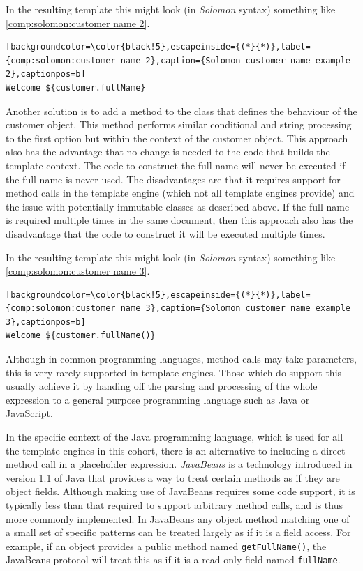 In the resulting template this might look (in \emph{Solomon} syntax) something like \autoref{comp:solomon:customer name 2}.

\begin{lstlisting}[backgroundcolor=\color{black!5},escapeinside={(*}{*)},label={comp:solomon:customer name 2},caption={Solomon customer name example 2},captionpos=b]
Welcome ${customer.fullName}
\end{lstlisting}

Another solution is to add a method to the class that defines the behaviour of the customer object. This method performs similar conditional and string processing to the first option but within the context of the customer object. This approach also has the advantage that no change is needed to the code that builds the template context. The code to construct the full name will never be executed if the full name is never used. The disadvantages are that it requires support for method calls in the \gls{template engine} (which not all \gls{template engine}s provide) and the issue with potentially immutable classes as described above. If the full name is required multiple times in the same document, then this approach also has the disadvantage that the code to construct it will be executed multiple times.

In the resulting template this might look (in \emph{Solomon} syntax) something like \autoref{comp:solomon:customer name 3}.

\begin{lstlisting}[backgroundcolor=\color{black!5},escapeinside={(*}{*)},label={comp:solomon:customer name 3},caption={Solomon customer name example 3},captionpos=b]
Welcome ${customer.fullName()}
\end{lstlisting}

Although in common \gls{programming language}s, method calls may take parameters, this is very rarely supported in \gls{template engine}s. Those which do support this usually achieve it by handing off the parsing and processing of the whole expression to a general purpose \gls{programming language} such as Java or JavaScript.

In the specific context of the Java \gls{programming language}, which is used for all the \gls{template engine}s in this cohort, there is an alternative to including a direct method call in a placeholder expression. \emph{\gls{JavaBeans}} is a technology introduced in version 1.1 of Java that provides a way to treat certain methods as if they are object fields. Although making use of \gls{JavaBeans} requires some code support, it is typically less than that required to support arbitrary method calls, and is thus more commonly implemented. In \gls{JavaBeans} any object method matching one of a small set of specific patterns can be treated largely as if it is a field access. For example, if an object provides a public method named \texttt{getFullName()}, the \gls{JavaBeans} protocol will treat this as if it is a read-only field named \texttt{fullName}.

